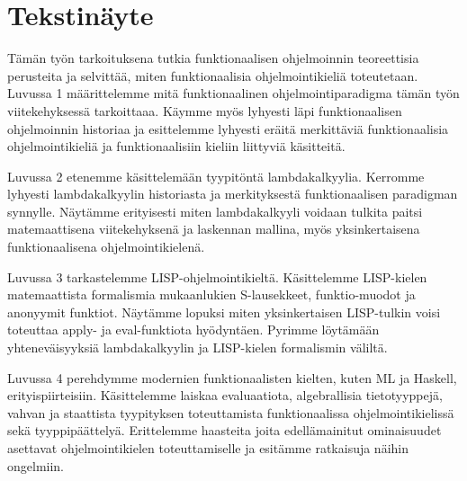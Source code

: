 \section{Tekstinäyte}

Tämän työn tarkoituksena tutkia funktionaalisen ohjelmoinnin teoreettisia perusteita ja selvittää, miten funktionaalisia ohjelmointikieliä toteutetaan. Luvussa 1 määrittelemme mitä funktionaalinen ohjelmointiparadigma tämän työn viitekehyksessä tarkoittaaa. Käymme myös lyhyesti läpi funktionaalisen ohjelmoinnin historiaa ja esittelemme lyhyesti eräitä merkittäviä funktionaalisia ohjelmointikieliä ja funktionaalisiin kieliin liittyviä käsitteitä. 

Luvussa 2 etenemme käsittelemään tyypitöntä lambdakalkyylia. Kerromme lyhyesti lambdakalkyylin historiasta ja merkityksestä funktionaalisen paradigman synnylle. Näytämme erityisesti miten lambdakalkyyli voidaan tulkita paitsi matemaattisena viitekehyksenä ja laskennan mallina, myös yksinkertaisena funktionaalisena ohjelmointikielenä. 

Luvussa 3 tarkastelemme LISP-ohjelmointikieltä. Käsittelemme LISP-kielen matemaattista formalismia mukaanlukien S-lausekkeet, funktio-muodot ja anonyymit funktiot. Näytämme lopuksi miten yksinkertaisen LISP-tulkin voisi toteuttaa apply- ja eval-funktiota hyödyntäen. Pyrimme löytämään yhteneväisyyksiä lambdakalkyylin ja LISP-kielen formalismin väliltä.

Luvussa 4 perehdymme modernien funktionaalisten kielten, kuten ML ja Haskell, erityispiirteisiin. Käsittelemme laiskaa evaluaatiota, algebrallisia tietotyyppejä, vahvan ja staattista tyypityksen toteuttamista funktionaalissa ohjelmointikielissä sekä tyyppipäättelyä. Erittelemme haasteita joita edellämainitut ominaisuudet asettavat ohjelmointikielen toteuttamiselle ja esitämme ratkaisuja näihin ongelmiin.